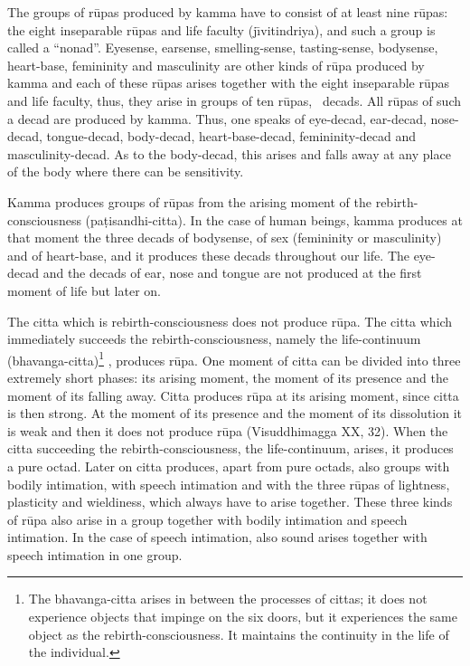 \documentclass{book}
\begin{document}
The groups of r\=upas produced by kamma have to consist of at least nine
r\=upas: the eight inseparable r\=upas and life faculty
(j\=\i v\-itindriya), and such a group is called a ``nonad''. Eyesense,
earsense, smelling-sense, tasting-sense, bodysense, heart-base,
femininity and masculinity are other kinds of r\=upa produced by kamma
and each of these r\=upas arises together with the eight inseparable
r\=upas and life faculty, thus, they arise in groups of ten r\=upas,
\ decads. All r\=upas of such a decad are produced by kamma. Thus, one
speaks of eye-decad, ear-decad, nose-decad, tongue-decad,
body-decad, heart-base-decad, femininity-decad and
masculinity-decad. As to the body-decad, this arises and falls away
at any place of the body where there can be sensitivity.

Kamma produces groups of r\=upas from the arising moment of the
rebirth-consciousness (pa\d t\-isan\-dhi-citta). In the case of human
beings, kamma produces at that moment the three decads of bodysense, of
sex (femininity or masculinity) and of heart-base, and it produces
these decads throughout our life. The eye-decad and the decads of
ear, nose and tongue are not produced at the first moment of life but
later on. 

The citta which is rebirth-consciousness does not produce r\=upa. The
citta which immediately succeeds the rebirth-consc\-ious\-ness, na\-mely
the life-continuum (bhavanga-citta)\footnote{The bhavanga-citta
arises in between the processes of cittas; it does not experience
objects that impinge on the six doors, but it experiences the same
object as the rebirth-consciousness. It maintains the continuity in the 
life of the individual.} , produces r\=upa. One moment of citta can be divided into three
extremely short phases: its arising moment, the moment of its presence
and the moment of its falling away. Citta produces r\=upa at its
arising moment, since citta is then strong. At the moment of its
presence and the moment of its dissolution it is weak and then it does
not produce r\=upa (Visuddhimagga XX, 32). When the citta succeeding
the rebirth-consciousness, the life-continuum, arises, it produces
a pure octad. Later on citta produces, apart from pure octads, also
groups with bodily intimation, with speech intimation and with the
three r\=upas of lightness, plasticity and wieldiness, which
always have to arise together. These three kinds of r\=upa also arise
in a group together with bodily intimation and speech intimation. In
the case of speech intimation, also sound arises together with speech
intimation in one group. 
\end{document}
